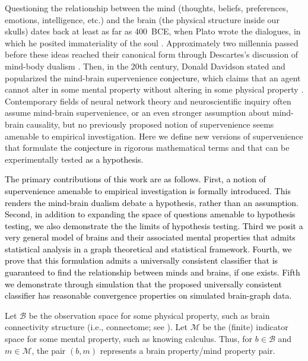 \documentclass{article}
\newcommand{\mB}{\mathcal{B}}
\newcommand{\mM}{\mathcal{M}}
\providecommand{\tr}[1]{\textcolor{black}{#1}}
\begin{document}
\vspace*{0.5 in}



Questioning the relationship between the mind (thoughts, beliefs, preferences, emotions, intelligence, etc.) and the brain (the physical structure inside our skulls) dates back at least as far as 400~BCE, when Plato wrote the dialogues, in which he posited immateriality of the soul \cite{Plato97}. Approximately two millennia passed before these ideas reached their canonical form through Descartes's discussion of mind-body dualism \cite{Descartes1641}. Then, in the 20th century, Donald Davidson stated and popularized the mind-brain supervenience \tr{conjecture}, which claims that an agent cannot alter in some mental property without altering in some physical property \cite{Davidson70}. Contemporary fields of neural network theory and neuroscientific inquiry often assume mind-brain supervenience, or an even stronger assumption about mind-brain causality, but no previously proposed notion of supervenience seems amenable to empirical investigation. Here we define new versions of supervenience that formulate the \tr{conjecture} in rigorous mathematical terms and that can be experimentally tested \tr{as a hypothesis}.

\tr{The primary contributions of this work are as follows.  First, a notion of supervenience amenable to empirical investigation is formally introduced.  This renders the mind-brain dualism debate a hypothesis, rather than an assumption.  Second, in addition to expanding the space of questions amenable to hypothesis testing, we also demonstrate the the limits of hypothesis testing.  Third we posit a very general model of brains and their associated mental properties that admits statistical analysis in a graph theoretical and statistical framework.  Fourth, we prove that this formulation admits a universally consistent classifier that is guaranteed to find the relationship between minds and brains, if one exists.  Fifth we demonstrate through simulation that the proposed universally consistent classifier has reasonable convergence properties on simulated brain-graph data.}

Let $\mB$ be the observation space for some physical property, such as brain connectivity structure (i.e., connectome; see \cite{SpornsKotter05,LichtmanSanes08,Seung09}). Let $\mM$ be the (finite) indicator space for some mental property, such as knowing calculus. Thus, for $b \in \mB$ and $m \in \mM$, the pair $(b,m)$ represents a brain property/mind property pair.
\end{document}
